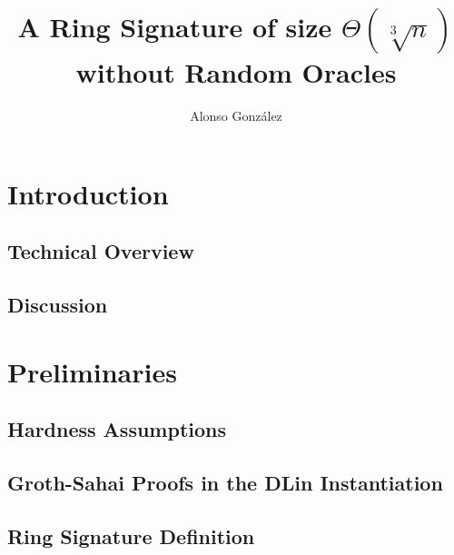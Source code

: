 \documentclass{llncs}
\author{Alonso Gonz\'alez}
\institute
{
	Ecole Normale Sup´\'erieure de Lyon, Laboratoire LIP (France)\\
	\email{alonso.gonzalez@ens-lyon.fr}
}
\title{A Ring Signature of size $\Theta(\sqrt[3]{n})$ without Random Oracles}
\begin{document}
	
\maketitle
\begin{abstract}
    
\end{abstract} 

\section{Introduction}

     

   \subsection{Technical Overview} \label{sec:tech-overview}

	

    \subsection{Discussion}

    	



\section{Preliminaries}

	

	\subsection{Hardness Assumptions}

	
        
	\subsection{Groth-Sahai Proofs in the DLin Instantiation} \label{sec:gs-proofs}
        
            

                \subsection{Ring Signature Definition}
    
            
\end{document}
